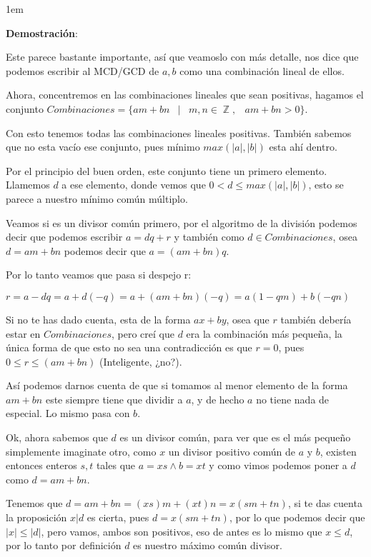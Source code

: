 \documentclass[12pt]{report}                                    %
\newcommand \Quote {\qq}                                        %
\newenvironment{SmallIndentation}[1][0.75em]                    %
    {\begin{adjustwidth}{#1}{}\begin{footnotesize}}                 %
    {\end{footnotesize}\end{adjustwidth}}                           %
\DeclareMathOperator \Space {\quad}                             %
\DeclareMathOperator \MiniSpace {\;}                            %
\newcommand \Such {\MiniSpace|\MiniSpace}                       %
\DeclareMathOperator \Integers  {\mathbb{Z}}                     %
\begin{document}
            \begin{SmallIndentation}[1em]
                \textbf{Demostración}:

                Este \Quote{teorema} parece bastante importante, así que veamoslo con más detalle,
                nos dice que podemos escribir al MCD/GCD de $a,b$ como una combinación lineal de
                ellos.

                Ahora, concentremos en las combinaciones lineales que sean positivas, hagamos el conjunto
                $Combinaciones = \{ am+bn \Such m, n \in \Integers, \MiniSpace am+bn > 0 \}$.

                Con esto tenemos todas las combinaciones lineales positivas.
                También sabemos que no esta vacío ese conjunto, pues mínimo $max(|a|,|b|)$ esta ahí dentro.

                Por el principio del buen orden, este conjunto tiene un primero elemento.
                Llamemos $d$ a ese elemento, donde vemos que $0 < d \leq max(|a|,|b|)$,
                esto se parece a nuestro mínimo común múltiplo.

                Veamos si es un divisor común primero, por el algoritmo de la división podemos decir
                que podemos escribir $a = dq + r$ y también como $d \in Combinaciones$, osea
                $d = am+bn$ podemos decir que $a = (am+bn)q$.

                Por lo tanto veamos que pasa si despejo r:

                $r = a-dq = a + d(-q) = a + (am+bn)(-q) = a(1-qm) + b(-qn)$

                Si no te has dado cuenta, esta de la forma $ax+by$, osea que $r$ también debería estar
                en $Combinaciones$, pero creí que $d$ era la combinación más pequeña, la única forma
                de que esto no sea una contradicción es que $r=0$, pues $0 \leq r \leq (am+bn)$
                (Inteligente, ¿no?).
                
                Así podemos darnos cuenta de que si tomamos al menor elemento de la forma $am+bn$ este
                siempre tiene que dividir a $a$, y de hecho $a$ no tiene nada de especial.
                Lo mismo pasa con $b$.

                Ok, ahora sabemos que $d$ es un divisor común, para ver que es el más pequeño
                simplemente imaginate otro, como $x$ un divisor positivo común de $a$ y $b$,
                existen entonces enteros $s,t$ tales que $a=xs \land b=xt$ y como vimos podemos poner a 
                $d$ como $d=am+bn$.

                Tenemos que $d = am+bn = (xs)m+(xt)n = x(sm+tn)$, si te das cuenta la proposición
                $x|d$ es cierta, pues $d = x(sm+tn)$, por lo que podemos decir que $|x| \leq |d|$, 
                pero vamos, ambos son positivos, eso de antes es lo mismo que $x \leq d$, por lo
                tanto por definición $d$ es nuestro máximo común divisor.

            \end{SmallIndentation}
\end{document}
